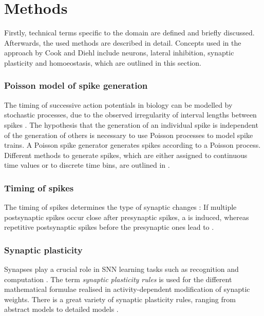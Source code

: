 \section{Methods}
\label{subsec:methods}

Firstly, technical terms specific to the domain are defined and briefly discussed.
Afterwards, the used methods are described in detail.
Concepts used in the approach by Cook and Diehl \cite{SNN} include  neurons, lateral inhibition, synaptic plasticity and homoeostasis, which are outlined in this section.



\subsubsection{Poisson model of spike generation}
The timing of successive action potentials in biology can be modelled by stochastic processes, 
due to the observed irregularity of interval lengths between spikes \cite{poisson_spike_generation}.
The hypothesis that the generation of an individual spike is independent of the generation of others 
is necessary to use Poisson processes to model spike trains.
A Poisson spike generator generates spikes according to a Poisson process.
Different methods to generate spikes, which are either assigned to continuous time values or to discrete time bins,
 are outlined in \cite{poisson_spike_generation}.

\subsubsection{Timing of spikes}
The timing of spikes determines the type of synaptic changes \cite{LTP_D_bio}:
If multiple postsynaptic spikes occur close after presynaptic spikes, a  is induced, 
whereas repetitive postsynaptic spikes before the presynaptic ones lead to .


\subsubsection{Synaptic plasticity}
Synapses play a crucial role in \ac{SNN} learning tasks such as recognition and computation \cite{Synaptic_plasticity}.
The term \textit{synaptic plasticity rules} is used for the different mathematical formulae realised in activity-dependent modification of synaptic weights.
There is a great variety of synaptic plasticity rules, ranging from abstract models to detailed models \cite{Synaptic_plasticity}.

